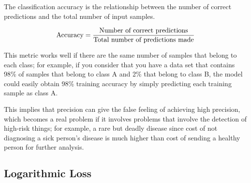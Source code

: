 The classification accuracy is the relationship between the number of correct predictions and the total number of input samples.

\begin{equation}
\textup{Accuracy} = \frac{\textup{Number of correct predictions}}{\textup{Total number of predictions made}}
\end{equation}

This metric works well if there are the same number of samples that belong to each class; for example, if you consider that you have a data set that contains 98\% of samples that belong to class A and 2\% that belong to class B, the model could easily obtain 98\% training accuracy by simply predicting each training sample as class A.

\vspace{5mm} %

This implies that precision can give the false feeling of achieving high precision, which becomes a real problem if it involves problems that involve the detection of high-risk things; for example, a rare but deadly disease since cost of not diagnosing a sick person's disease is much higher than cost of sending a healthy person for further analysis.

\subsection{Logarithmic Loss}

